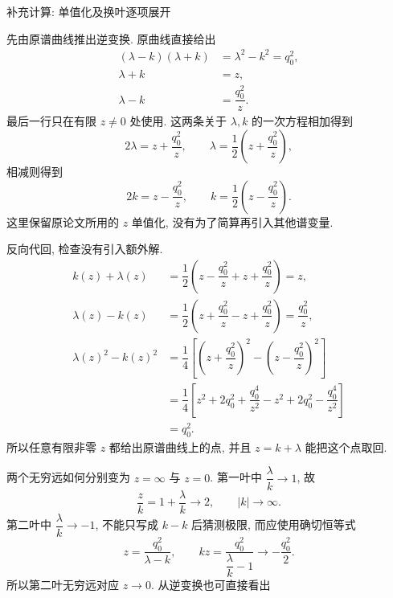 \par\medskip\noindent 补充计算: 单值化及换叶逐项展开\par
\par\smallskip\noindent 先由原谱曲线推出逆变换.\quad
原曲线直接给出
\begin{align*}
(\lambda-k)(\lambda+k)
&=\lambda^2-k^2=q_0^2,\\
\lambda+k&=z,\\
\lambda-k&=\dfrac{q_0^2}{z}.
\end{align*}
最后一行只在有限 $z\ne0$ 处使用. 这两条关于 $\lambda,k$ 的一次方程相加得到
\begin{equation*}
2\lambda=z+\dfrac{q_0^2}{z},
\qquad
\lambda=\dfrac{1}{2}\left(z+\dfrac{q_0^2}{z}\right),
\end{equation*}
相减则得到
\begin{equation*}
2k=z-\dfrac{q_0^2}{z},
\qquad
k=\dfrac{1}{2}\left(z-\dfrac{q_0^2}{z}\right).
\end{equation*}
这里保留原论文所用的 $z$ 单值化, 没有为了简算再引入其他谱变量.
\par\smallskip\noindent 反向代回, 检查没有引入额外解.\quad
\begin{align*}
k(z)+\lambda(z)
&=\dfrac{1}{2}\left(z-\dfrac{q_0^2}{z}
+z+\dfrac{q_0^2}{z}\right)=z,\\
\lambda(z)-k(z)
&=\dfrac{1}{2}\left(z+\dfrac{q_0^2}{z}
-z+\dfrac{q_0^2}{z}\right)
=\dfrac{q_0^2}{z},\\
\lambda(z)^2-k(z)^2
&=\dfrac{1}{4}\left[
\left(z+\dfrac{q_0^2}{z}\right)^2
-\left(z-\dfrac{q_0^2}{z}\right)^2\right]\\
&=\dfrac{1}{4}\left[
z^2+2q_0^2+\dfrac{q_0^4}{z^2}
-z^2+2q_0^2-\dfrac{q_0^4}{z^2}\right]\\
&=q_0^2.
\end{align*}
所以任意有限非零 $z$ 都给出原谱曲线上的点, 并且 $z=k+\lambda$ 能把这个点取回.
\par\smallskip\noindent 两个无穷远如何分别变为 $z=\infty$ 与 $z=0$.\quad
第一叶中 $\dfrac{\lambda}{k}\to1$, 故
\begin{equation*}
\dfrac{z}{k}=1+\dfrac{\lambda}{k}\longrightarrow2,
\qquad |k|\longrightarrow\infty.
\end{equation*}
第二叶中 $\dfrac{\lambda}{k}\to-1$, 不能只写成 $k-k$ 后猜测极限, 而应使用确切恒等式
\begin{equation*}
z=\dfrac{q_0^2}{\lambda-k},
\qquad
kz=\dfrac{q_0^2}{\dfrac{\lambda}{k}-1}
\longrightarrow-\dfrac{q_0^2}{2}.
\end{equation*}
所以第二叶无穷远对应 $z\to0$. 从逆变换也可直接看出
